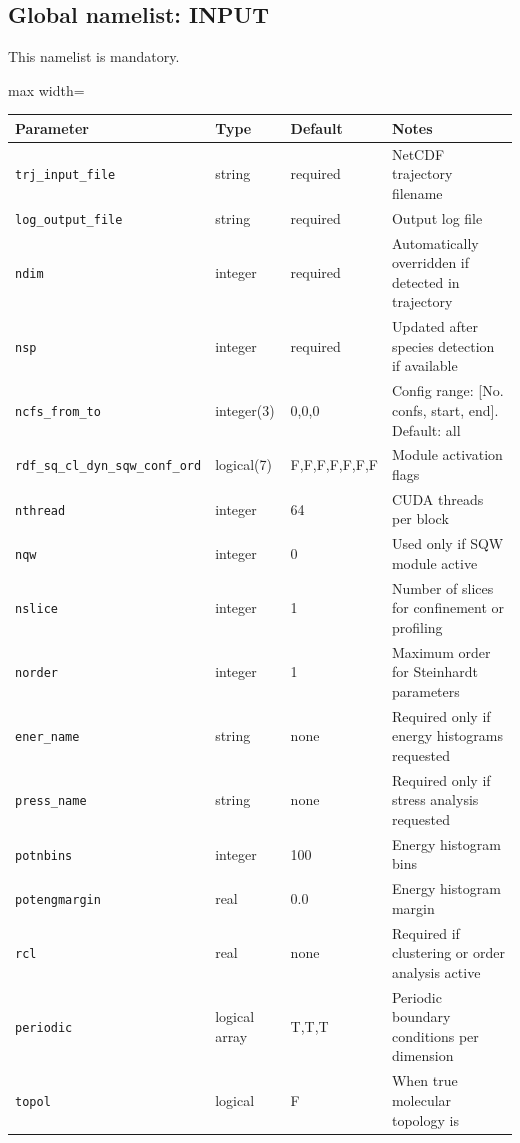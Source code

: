 \documentclass[final,1p,times]{elsarticle}
\begin{document}
\subsection{Global namelist: INPUT}
This namelist is mandatory.
\begin{center}
\begin{adjustbox}{max width=\textwidth}
\begin{tabular}{llll}
\hline
Parameter & Type & Default & Notes \\
\hline
\texttt{trj\_input\_file} & string & required & NetCDF trajectory filename \\
\texttt{log\_output\_file} & string & required & Output log file \\
\texttt{ndim} & integer & required & Automatically overridden if detected in trajectory \\
\texttt{nsp} & integer & required & Updated after species detection if available \\
\texttt{ncfs\_from\_to} & integer(3) & 0,0,0 & Config range:
                                               [No. confs, start,
                                               end]. Default:  all \\
\texttt{rdf\_sq\_cl\_dyn\_sqw\_conf\_ord} & logical(7) & F,F,F,F,F,F,F & Module activation flags \\
\texttt{nthread} & integer & 64 & CUDA threads per block \\
\texttt{nqw} & integer & 0 & Used only if SQW module active \\
\texttt{nslice} & integer & 1 & Number of slices for confinement or profiling \\
\texttt{norder} & integer & 1 & Maximum order for Steinhardt parameters \\
\texttt{ener\_name} & string & none & Required only if energy histograms requested \\
\texttt{press\_name} & string & none & Required only if stress analysis requested \\
\texttt{potnbins} & integer & 100 & Energy histogram bins \\
\texttt{potengmargin} & real & 0.0 & Energy histogram margin \\
\texttt{rcl} & real & none & Required if clustering or order analysis active \\
\texttt{periodic} & logical array & T,T,T & Periodic boundary
                                            conditions per dimension
  \\
\texttt{topol} & logical & F & When true molecular topology is

\end{tabular}
\end{adjustbox}
\end{center}
\end{document}

